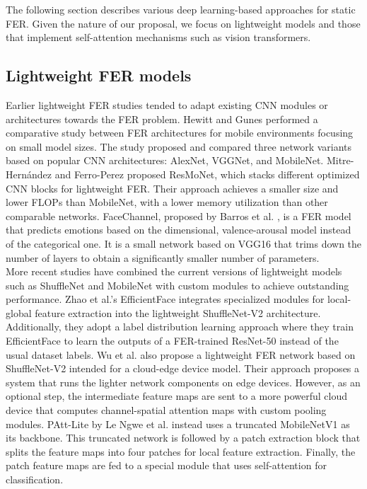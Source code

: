 \documentclass[../main.tex]{subfiles}
\begin{document}
The following section describes various deep learning-based approaches for static FER.
Given the nature of our proposal, we focus on lightweight models and those that implement self-attention mechanisms such as vision transformers.

\subsection{Lightweight FER models}

Earlier lightweight FER studies tended to adapt existing CNN modules or architectures towards the FER problem.
Hewitt and Gunes \cite{hewitt2018} performed a comparative study between FER architectures for mobile environments focusing on small model sizes.
The study proposed and compared three network variants based on popular CNN architectures: AlexNet, VGGNet, and MobileNet. 
Mitre-Hernández and Ferro-Perez \cite{mitre2020} proposed ResMoNet, which stacks different optimized CNN blocks for lightweight FER.
Their approach achieves a smaller size and lower FLOPs than MobileNet, with a lower memory utilization than other comparable networks.
FaceChannel, proposed by Barros et al. \cite{barros2020fc}, is a FER model that predicts emotions based on the dimensional, valence-arousal model instead of the categorical one.
It is a small network based on VGG16 that trims down the number of layers to obtain a significantly smaller number of parameters.\\

More recent studies have combined the current versions of lightweight models such as ShuffleNet and MobileNet with custom modules to achieve outstanding performance.
Zhao et al.'s \cite{eff-face2021} EfficientFace integrates specialized modules for local-global feature extraction into the lightweight ShuffleNet-V2 architecture.
Additionally, they adopt a label distribution learning approach where they train EfficientFace to learn the outputs of a FER-trained ResNet-50 instead of the usual dataset labels.
Wu et al. \cite{wu2020edge} also propose a lightweight FER network based on ShuffleNet-V2 intended for a cloud-edge device model.
Their approach proposes a system that runs the lighter network components on edge devices.
However, as an optional step, the intermediate feature maps are sent to a more powerful cloud device that computes channel-spatial attention maps with custom pooling modules.
PAtt-Lite by Le Ngwe et al. \cite{lengwe2023pattlite} instead uses a truncated MobileNetV1 as its backbone.
This truncated network is followed by a patch extraction block that splits the feature maps into four patches for local feature extraction.
Finally, the patch feature maps are fed to a special module that uses self-attention for classification.
\end{document}
